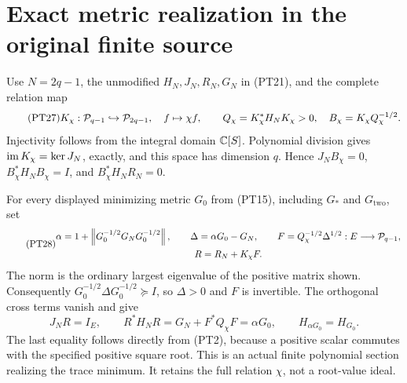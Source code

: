 \section{Exact metric realization in the original finite source}

Use \(N=2q-1\), the unmodified \(H_N,J_N,R_N,G_N\) in
(PT21), and the complete relation map
\begin{equation}\tag{PT27}
 K_\chi:\mathcal P_{q-1}\hookrightarrow\mathcal P_{2q-1},\quad
 f\mapsto\chi f,\qquad
 Q_\chi=K_\chi^*H_NK_\chi>0,\quad
 B_\chi=K_\chi Q_\chi^{-1/2}.
\end{equation}
Injectivity follows from the integral domain \(\mathbb C[S]\).
Polynomial division gives \(\operatorname{im} K_\chi=\ker J_N\), exactly,
and this space has dimension \(q\). Hence
\(J_NB_\chi=0\), \(B_\chi^*H_NB_\chi=I\), and
\(B_\chi^*H_NR_N=0\).

For every displayed minimizing metric \(G_0\) from (PT15),
including \(G_*\) and \(G_{\mathrm{two}}\), set
\begin{equation}\tag{PT28}
 \begin{gathered}
 \alpha=1+\left\lVert G_0^{-1/2}G_NG_0^{-1/2}\right\rVert,\qquad
 \Delta=\alpha G_0-G_N,\qquad
 F=Q_\chi^{-1/2}\Delta^{1/2}:E\longrightarrow\mathcal P_{q-1},\\
 R=R_N+K_\chi F.
 \end{gathered}
\end{equation}
The norm is the ordinary largest eigenvalue of the positive matrix
shown. Consequently
\(G_0^{-1/2}\Delta G_0^{-1/2}\succeq I\), so \(\Delta>0\)
and \(F\) is invertible. The orthogonal cross terms vanish and give
\begin{equation}\tag{PT29}
 J_NR=I_E,\qquad R^*H_NR=G_N+F^*Q_\chi F
                         =\alpha G_0,\qquad
 H_{\alpha G_0}=H_{G_0}.
\end{equation}
The last equality follows directly from (PT2), because a positive
scalar commutes with the specified positive square root. This is
an actual finite polynomial section realizing the trace minimum.
It retains the full relation \(\chi\), not a root-value ideal.

